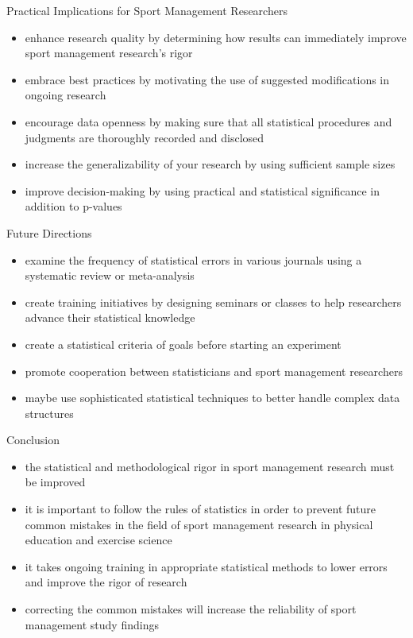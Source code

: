 \documentclass[aspectratio=169, 12pt]{beamer}
\begin{document}
\begin{frame}{Practical Implications for Sport Management Researchers}
  \begin{itemize}
      \item enhance research quality by determining how results can immediately improve sport management research's rigor
      \item embrace best practices by motivating the use of suggested modifications in ongoing research
      \item encourage data openness by making sure that all statistical procedures and judgments are thoroughly recorded and disclosed
      \item increase the generalizability of your research by using sufficient sample sizes
      \item improve decision-making by using practical and statistical significance in addition to p-values
  \end{itemize}
\end{frame}


\begin{frame}{Future Directions}
  \begin{itemize}
      \item examine the frequency of statistical errors in various journals using a systematic review or meta-analysis
      \item create training initiatives by designing seminars or classes to help researchers advance their statistical knowledge
      \item create a statistical criteria of goals before starting an experiment
      \item promote cooperation between statisticians and sport management researchers
      \item maybe use sophisticated statistical techniques to better handle complex data structures
  \end{itemize}
\end{frame}


\begin{frame}{Conclusion}
  \begin{itemize}
      \item the statistical and methodological rigor in sport management research must be improved
      \item it is important to follow the rules of statistics in order to prevent future common mistakes in the field of sport management research in physical education and exercise science
      \item it takes ongoing training in appropriate statistical methods to lower errors and improve the rigor of research
      \item correcting the common mistakes will increase the reliability of sport management study findings
  \end{itemize}
\end{frame}
\end{document}

